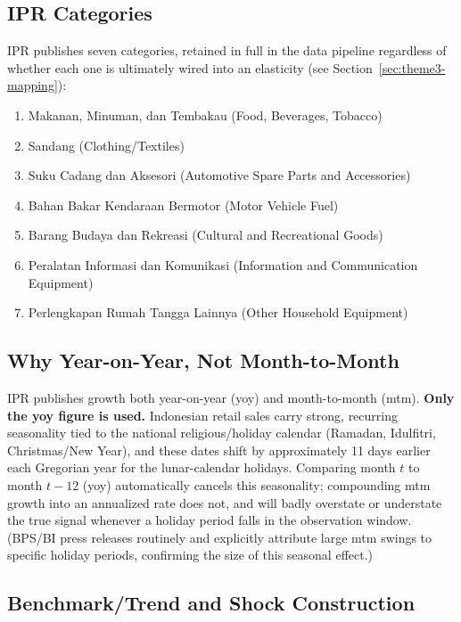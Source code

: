 \documentclass[11pt]{article}
\begin{document}
\subsection{IPR Categories}

IPR publishes seven categories, retained in full in the data pipeline
regardless of whether each one is ultimately wired into an elasticity (see
Section~\ref{sec:theme3-mapping}):

\begin{enumerate}
  \item Makanan, Minuman, dan Tembakau (Food, Beverages, Tobacco)
  \item Sandang (Clothing/Textiles)
  \item Suku Cadang dan Aksesori (Automotive Spare Parts and Accessories)
  \item Bahan Bakar Kendaraan Bermotor (Motor Vehicle Fuel)
  \item Barang Budaya dan Rekreasi (Cultural and Recreational Goods)
  \item Peralatan Informasi dan Komunikasi (Information and Communication
  Equipment)
  \item Perlengkapan Rumah Tangga Lainnya (Other Household Equipment)
\end{enumerate}

\subsection{Why Year-on-Year, Not Month-to-Month}

IPR publishes growth both year-on-year (yoy) and month-to-month (mtm).
\textbf{Only the yoy figure is used.} Indonesian retail sales carry strong,
recurring seasonality tied to the national religious/holiday calendar
(Ramadan, Idulfitri, Christmas/New Year), and these dates shift by
approximately 11 days earlier each Gregorian year for the lunar-calendar
holidays. Comparing month $t$ to month $t-12$ (yoy) automatically cancels
this seasonality; compounding mtm growth into an annualized rate does not,
and will badly overstate or understate the true signal whenever a holiday
period falls in the observation window. (BPS/BI press releases routinely and
explicitly attribute large mtm swings to specific holiday periods,
confirming the size of this seasonal effect.)

\subsection{Benchmark/Trend and Shock Construction}
\end{document}
